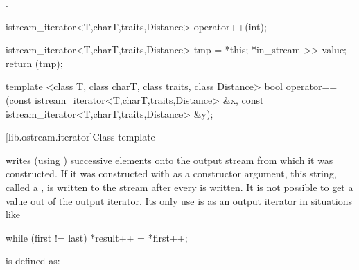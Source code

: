 \begin{itemdescr}
\pnum
\effects
{}.

\pnum
\returns
{}
\end{itemdescr}

%
%
\begin{itemdecl}
istream_iterator<T,charT,traits,Distance> operator++(int);
\end{itemdecl}

\begin{itemdescr}
\pnum
\effects
\begin{codeblock}
  istream_iterator<T,charT,traits,Distance> tmp = *this;
  *in_stream >> value;
  return (tmp);
\end{codeblock}
\end{itemdescr}

%
%
\begin{itemdecl}
template <class T, class charT, class traits, class Distance>
  bool operator==(const istream_iterator<T,charT,traits,Distance> &x,
                  const istream_iterator<T,charT,traits,Distance> &y);
\end{itemdecl}

\begin{itemdescr}
\pnum
\returns
{}%
\end{itemdescr}

[lib.ostream.iterator]{Class template }

\pnum
{}%
writes (using
)
successive elements onto the output stream from which it was constructed.
If it was constructed with
as a constructor argument, this string, called a
,
is written to the stream after every
is written.
It is not possible to get a value out of the output iterator.
Its only use is as an output iterator in situations like

\begin{codeblock}
while (first != last) *result++ = *first++;
\end{codeblock}

\pnum
{}
is defined as:

